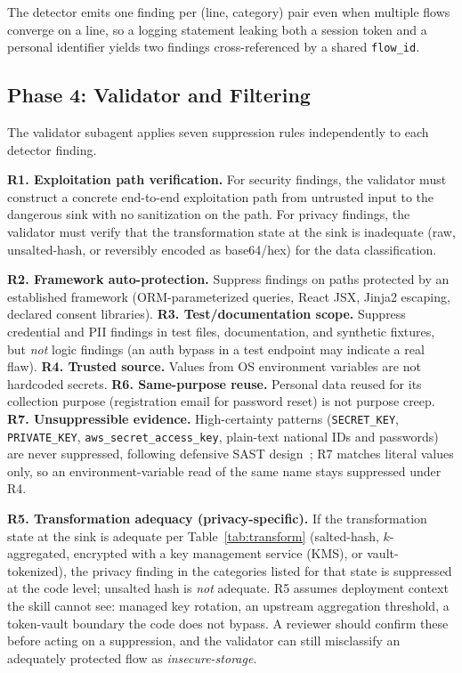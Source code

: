 \documentclass[runningheads]{llncs}
\begin{document}
The detector emits one finding per (line, category) pair even when multiple flows converge on a line, so a logging statement leaking both a session token and a personal identifier yields two findings cross-referenced by a shared \texttt{flow\_id}.

\subsection{Phase 4: Validator and Filtering}\label{sec:supp}

The validator subagent applies seven suppression rules independently to each detector finding.

\textbf{R1. Exploitation path verification.} For security findings, the validator must construct a concrete end-to-end exploitation path from untrusted input to the dangerous sink with no sanitization on the path. For privacy findings, the validator must verify that the transformation state at the sink is inadequate (raw, unsalted-hash, or reversibly encoded as base64/hex) for the data classification.

\textbf{R2. Framework auto-protection.} Suppress findings on paths protected by an established framework (ORM-parameterized queries, React JSX, Jinja2 escaping, declared consent libraries). \textbf{R3. Test/documentation scope.} Suppress credential and PII findings in test files, documentation, and synthetic fixtures, but \emph{not} logic findings (an auth bypass in a test endpoint may indicate a real flaw). \textbf{R4. Trusted source.} Values from OS environment variables are not hardcoded secrets. \textbf{R6. Same-purpose reuse.} Personal data reused for its collection purpose (registration email for password reset) is not purpose creep. \textbf{R7. Unsuppressible evidence.} High-certainty patterns (\texttt{SECRET\_KEY}, \texttt{PRIVATE\_KEY}, \texttt{aws\_secret\_\allowbreak{}access\_key}, plain-text national IDs and passwords) are never suppressed, following defensive SAST design~\cite{beljulji2025llmscr}; R7 matches literal values only, so an environment-variable read of the same name stays suppressed under R4.

\textbf{R5. Transformation adequacy (privacy-specific).} If the transformation state at the sink is adequate per Table~\ref{tab:transform} (salted-hash, $k$-aggregated, encrypted with a key management service (KMS), or vault-tokenized), the privacy finding in the categories listed for that state is suppressed at the code level; unsalted hash is \emph{not} adequate. R5 assumes deployment context the skill cannot see: managed key rotation, an upstream aggregation threshold, a token-vault boundary the code does not bypass. A reviewer should confirm these before acting on a suppression, and the validator can still misclassify an adequately protected flow as \emph{insecure-storage}.
\end{document}
